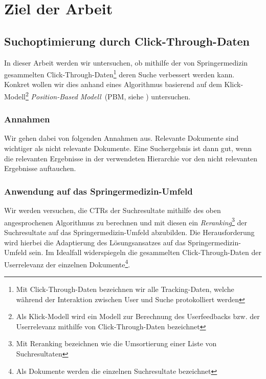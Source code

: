 \pagebreak
\section{Ziel der Arbeit}
\label{sec:Einfuehrung:ZielArbeit}

\subsection{Suchoptimierung durch Click-Through-Daten}
\label{sec:Einfuehrung:ZielArbeit:Suchoptimierung}

In dieser Arbeit werden wir untersuchen, ob mithilfe der von Springermedizin gesammelten Click-Through-Daten\footnote{Mit Click-Through-Daten bezeichnen wir alle Tracking-Daten, welche während der Interaktion zwischen User und Suche protokolliert werden} deren Suche verbessert werden kann. Konkret wollen wir dies anhand eines Algorithmus basierend auf dem Klick-Modell\footnote{Als Klick-Modell wird ein Modell zur Berechnung des Userfeedbacks bzw. der Userrelevanz mithilfe von Click-Through-Daten bezeichnet} \textit{Position-Based Modell}~(PBM, siehe \cite{pbm}) untersuchen.

\subsubsection{Annahmen}
\label{sec:Einfuehrung:ZielArbeit:Suchoptimierung:Annahmen}

Wir gehen dabei von folgenden Annahmen aus. Relevante Dokumente sind wichtiger als nicht relevante Dokumente. Eine Suchergebnis ist dann gut, wenn die relevanten Ergebnisse in der verwendeten Hierarchie vor den nicht relevanten Ergebnisse auftauchen. 

\subsubsection{Anwendung auf das Springermedizin-Umfeld}
\label{sec:Einfuehrung:ZielArbeit:Suchoptimierung:AnwendungSpringermedizin-Umfeld}

Wir werden versuchen, die CTRs der Suchresultate mithilfe des oben angesprochenen Algorithmus zu berechnen und mit diesen ein \textit{Reranking}\footnote{Mit Reranking bezeichnen wie die Umsortierung einer Liste von Suchresultaten} der Suchresultate auf das Springermedizin-Umfeld abzubilden. Die Herausforderung wird hierbei die Adaptierung des Lösungsansatzes auf das Springermedizin-Umfeld sein. Im Idealfall widerspiegeln die gesammelten Click-Through-Daten der Userrelevanz der einzelnen Dokumente\footnote{Als Dokumente werden die einzelnen Suchresultate bezeichnet}.

